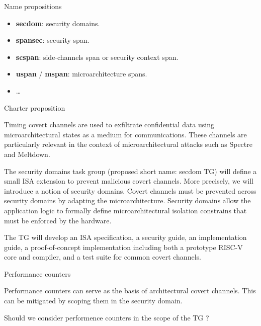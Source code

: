 \documentclass[11pt]{beamer}
\begin{document}


\begin{frame}{Name propositions}
\begin{itemize}
    \item \textbf{secdom}: security domains.
    \item \textbf{spansec}: security span.
    \item \textbf{scspan}: side-channels span or security context span.
    \item \textbf{uspan} / \textbf{mspan}: microarchitecture spans.
    \item \ldots
\end{itemize}
\end{frame}

\begin{frame}{Charter proposition}
    \begin{block}{}
        \begin{small}
Timing covert channels are used to exfiltrate confidential data using microarchitectural states as a medium for communications.
These channels are particularly relevant in the context of microarchitectural attacks such as Spectre and Meltdown.


The security domains task group (proposed short name: secdom TG) will define a small ISA extension to prevent malicious covert channels.
More precisely, we will introduce a notion of security domains. Covert channels must be prevented across security domains by adapting the microarchitecture. Security domains allow the application logic to formally define microarchitectural isolation constrains that must be enforced by the hardware.


The TG will develop an ISA specification, a security guide, an implementation guide, a proof-of-concept implementation including both a prototype RISC-V core and compiler, and a test suite for common covert channels.
        \end{small}
    \end{block}
\end{frame}

\begin{frame}{Performance counters}

    \begin{block}{}
        Performance counters can serve as the basis of architectural covert channels.
        This can be mitigated by scoping them in the security domain.
    \end{block}

    \begin{block}{}
        Should we consider performence counters in the scope of the TG ?
    \end{block}
\end{frame}
\end{document}
